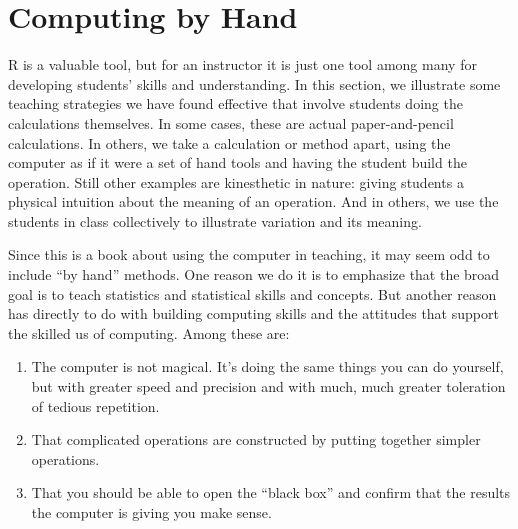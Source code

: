 \chapter{Computing by Hand}

\label{chap:byhand}








R is a valuable tool, but for an instructor it is just one tool among
many for developing students' skills and understanding.   In this
section, we illustrate some teaching strategies we have found effective
that involve students doing the calculations themselves.  In some
cases, these are actual paper-and-pencil calculations.  In others, we
take a calculation or method apart, using the computer as if it were a set
of hand tools and having the student build the operation.  Still other
examples are kinesthetic in nature: giving students a physical
intuition about the meaning of an operation.  And in others, we use
the students in class collectively to illustrate variation and its meaning.

Since this is a book about using the computer in teaching, it may seem
odd to include ``by hand'' methods.  One reason we do it is to
emphasize that the broad goal is to teach statistics and statistical skills
and concepts.  But another reason has directly to do with building
computing skills and the attitudes that support the skilled us of
computing.  Among these are:
\begin{enumerate}
  \item The computer is not magical.  It's doing the same things you
    can do yourself, but with greater speed and precision and with
    much, much greater toleration of tedious repetition.
  \item That complicated operations are constructed by putting
    together simpler operations.  
  \item That you should be able to open the ``black box'' and confirm
    that the results the computer is giving you make sense.
\end{enumerate}







